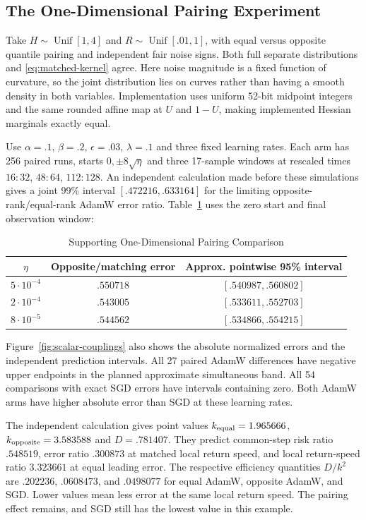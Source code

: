 \subsection{The One-Dimensional Pairing Experiment}
Take $H\sim\operatorname{Unif}[1,4]$ and
$R\sim\operatorname{Unif}[.01,1]$, with equal versus opposite quantile
pairing and independent fair noise signs. Both full separate distributions
and \eqref{eq:matched-kernel} agree. Here noise magnitude is a fixed function
of curvature, so the joint distribution lies on curves rather than having
a smooth density in both variables. Implementation uses
uniform 52-bit midpoint integers and the same rounded affine map at $U$
and $1-U$, making implemented Hessian marginals exactly equal.

Use $\alpha=.1$, $\beta=.2$, $\epsilon=.03$, $\lambda=.1$ and three
fixed learning rates. Each arm has 256 paired runs, starts $0,\pm8\sqrt\eta$
and three 17-sample windows at rescaled times $16{:}32$, $48{:}64$,
$112{:}128$. An independent calculation made before these simulations gives
a joint 99\% interval $[.472216,.633164]$ for the limiting
opposite-rank/equal-rank AdamW error ratio. Table~\ref{tab:scalar-errors} uses the zero start
and final observation window:
\begin{table}[htbp]
\caption{Supporting One-Dimensional Pairing Comparison}\label{tab:scalar-errors}
\centering

\begin{tabular}{ccc}
\toprule
$\eta$ & Opposite/matching error & Approx. pointwise 95\% interval\\
\midrule
$5\cdot10^{-4}$ & $.550718$ & $[.540987,.560802]$\\
$2\cdot10^{-4}$ & $.543005$ & $[.533611,.552703]$\\
$8\cdot10^{-5}$ & $.544562$ & $[.534866,.554215]$\\
\bottomrule
\end{tabular}
\end{table}
Figure~\ref{fig:scalar-couplings} also shows the absolute normalized errors
and the independent prediction intervals. All 27 paired AdamW differences
have negative upper endpoints in the planned approximate simultaneous band.
All 54 comparisons with exact SGD errors have intervals containing zero.
Both AdamW arms have higher absolute error than SGD at these learning rates.

The independent calculation gives point values $k_{\rm equal}=1.965666$,
$k_{\rm opposite}=3.583588$ and $D=.781407$. They predict common-step
risk ratio $.548519$, error ratio $.300873$ at matched local return speed,
and local return-speed ratio $3.323661$ at equal leading error.
The respective efficiency quantities
$D/k^2$ are $.202236$, $.0608473$, and $.0498077$ for equal AdamW,
opposite AdamW, and SGD. Lower values mean less error at the same local
return speed. The pairing effect remains, and SGD still has the lowest
value in this example.

